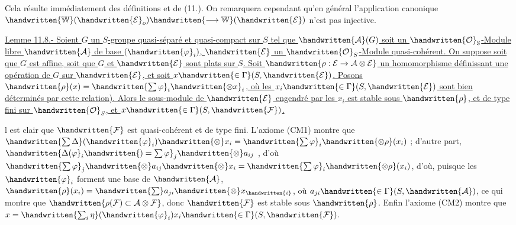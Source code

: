 Cela résulte immédiatement des définitions et de (11.). On remarquera cependant qu'en général l'application canonique $\handwritten{\mathbb{W}}(\handwritten{\mathcal{E}}_o)\handwritten{\longrightarrow\mathbb{W}}(\handwritten{\mathcal{E}})$ n'est pas injective.

\uline{Lemme 11.8.- Soient $G$ un $S$-groupe quasi-séparé et quasi-compact sur $S$ tel que $\handwritten{\mathcal{A}}(G)$ soit un $\handwritten{\mathcal{O}}_{\mathbb{S}}$-Module  libre $\handwritten{\mathcal{A}}$ de base $(\handwritten{\varphi}_i)$, $\handwritten{\mathcal{E}}$ un $\handwritten{\mathcal{O}}_S$-Module quasi-cohérent. On suppose soit que $G$ est affine, soit que $G$ et $\handwritten{\mathcal{E}}$ sont plats sur $S$. Soit $\handwritten{\rho:\mathcal{E}\to\mathcal{A}\otimes\mathcal{E}}$ un homomorphisme définissant une opération de $G$ sur $\handwritten{\mathcal{E}}$, et soit $x\handwritten{\in\Gamma}(S,\handwritten{\mathcal{E}})$. Posons $\handwritten{\rho}(x)=\handwritten{\sum\varphi}_i\handwritten{\otimes x}_i$, où les $x_i\handwritten{\in\Gamma}(S,\handwritten{\mathcal{E}})$ sont bien déterminés par cette relation). Alors le sous-module de $\handwritten{\mathcal{E}}$ engendré par les $x_i$ est stable sous $\handwritten{\rho}$, et de type fini sur $\handwritten{\mathcal{O}}_S$, et $x\handwritten{\in\Gamma}(S,\handwritten{\mathcal{F}})$.}

 l est clair que $\handwritten{\mathcal{F}}$ est quasi-cohérent et de type fini. L'axiome (CM1) montre que $\handwritten{\sum\Delta}(\handwritten{\varphi}_i)\handwritten{\otimes}x_i=\handwritten{\sum\varphi}_i\handwritten{\otimes\rho}(x_i)$ ; d'autre part, $\handwritten{\Delta(\varphi}_i\handwritten{)=\sum\varphi}_j\handwritten{\otimes}a_{ij}$ , d'où $\handwritten{\sum\varphi}_j\handwritten{\otimes}a_{ij}\handwritten{\otimes}x_i=\handwritten{\sum\varphi}_i\handwritten{\otimes\rho}(x_i)$, d'où, puisque les $\handwritten{\varphi}_i$ forment une base de $\handwritten{\mathcal{A}}$, $\handwritten{\rho}(x_i)=\handwritten{\sum}a_{ji}\handwritten{\otimes}x_{\handwritten{i}}$, où $a_{ji}\handwritten{\in\Gamma}(S,\handwritten{\mathcal{A}})$, ce qui montre que $\handwritten{\rho(\mathcal{F})\subset\mathcal{A}\otimes\mathcal{F}}$, donc $\handwritten{\mathcal{F}}$ est stable sous $\handwritten{\rho}$. Enfin l'axiome (CM2) montre que $x=\handwritten{\sum_i\eta}(\handwritten{\varphi}_i)x_i\handwritten{\in\Gamma}(S,\handwritten{\mathcal{F}})$.

